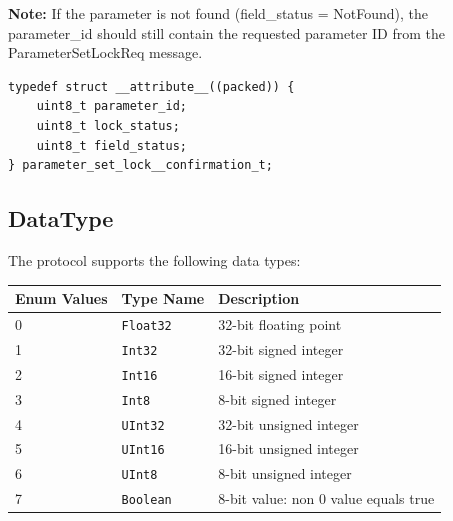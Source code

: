 \textbf{Note:} If the parameter is not found (field\_status = NotFound), the parameter\_id should still contain the requested parameter ID from the ParameterSetLockReq message.


\begin{lstlisting}[caption={ParameterSetLockConfirmation struct}]
typedef struct __attribute__((packed)) {
    uint8_t parameter_id;
    uint8_t lock_status;
    uint8_t field_status;
} parameter_set_lock__confirmation_t;
\end{lstlisting}


\subsection{DataType}\label{subsec:DataType}
The protocol supports the following data types:
\begin{center}
\begin{tabular}{l l l}
\toprule
Enum Values & Type Name & Description \\
\midrule
0 & \texttt{Float32} & 32-bit floating point \\
1 & \texttt{Int32} & 32-bit signed integer \\
2 & \texttt{Int16} & 16-bit signed integer \\
3 & \texttt{Int8} & 8-bit signed integer \\
4 & \texttt{UInt32} & 32-bit unsigned integer \\
5 & \texttt{UInt16} & 16-bit unsigned integer \\
6 & \texttt{UInt8} & 8-bit unsigned integer \\
7 & \texttt{Boolean} & 8-bit value: non 0 value equals true \\

\bottomrule
\end{tabular}
\end{center}
